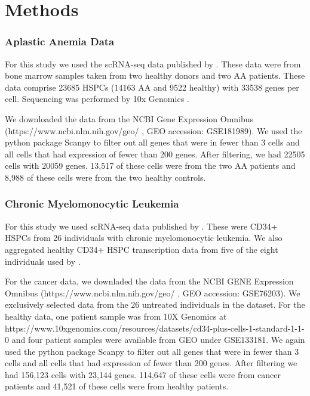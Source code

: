 \documentclass{article}
\begin{document}
\section{Methods}

\subsubsection{Aplastic Anemia Data}
For this study we used the scRNA-seq data published by \citet{tonglin_single-cell_2022}.
These data were from bone marrow samples taken from two healthy donors and two AA patients.
These data comprise 23685 HSPCs (14163 AA and 9522 healthy) with 33538 genes per cell.
Sequencing was performed by 10x Genomics \citep{10X_genomics}.

We downloaded the data from the NCBI Gene Expression Omnibus (https://www.ncbi.nlm.nih.gov/geo/ , GEO accession: GSE181989).
We used the python package Scanpy \citep{wolf_scanpy_2018} to filter out all genes that were in fewer than 3 cells and all cells that had expression of fewer than 200 genes.
After filtering, we had 22505 cells with 20059 genes.
13,517 of these cells were from the two AA patients and 8,988 of these cells were from the two healthy controls.

\subsubsection{Chronic Myelomonocytic Leukemia}
For this study we used scRNA-seq data published by \citet{ferrall-fairbanks_progenitor_2022}.
These were CD34+ HSPCs from 26 individuals with chronic myelomonocytic leukemia.
We also aggregated healthy CD34+ HSPC transcription data from five of the eight individuals used by \citet{ferrall-fairbanks_progenitor_2022}.

For the cancer data, we downladed the data from the NCBI GENE Expression Omnibus (https://www.ncbi.nlm.nih.gov/geo/ , GEO accession: GSE76203).
We exclusively selected data from the 26 untreated individuals in the dataset.
For the healthy data, one patient sample was from 10X Genomics at https://www.10xgenomics.com/resources/datasets/cd34-plus-cells-1-standard-1-1-0 and four patient samples were available from GEO under GSE133181.
We again used the python package Scanpy to filter out all genes that were in fewer than 3 cells and all cells that had expression of fewer than 200 genes.
After filtering we had 156,123 cells with 23,144 genes.
114,647 of these cells were from cancer patients and 41,521 of these cells were from healthy patients.
\end{document}
